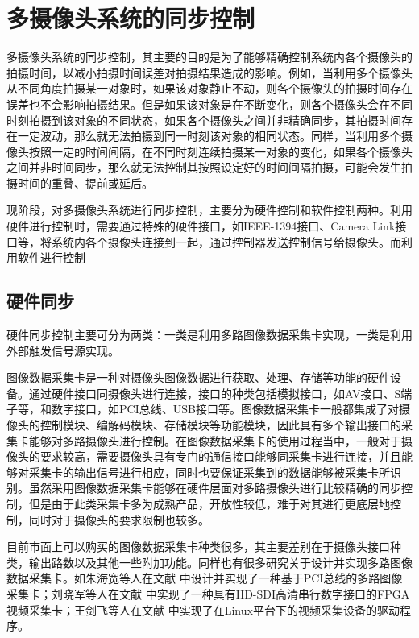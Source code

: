 \section{多摄像头系统的同步控制}

多摄像头系统的同步控制，其主要的目的是为了能够精确控制系统内各个摄像头的拍摄时间，以减小拍摄时间误差对拍摄结果造成的影响。例如，当利用多个摄像头从不同角度拍摄某一对象时，如果该对象静止不动，则各个摄像头的拍摄时间存在误差也不会影响拍摄结果。但是如果该对象是在不断变化，则各个摄像头会在不同时刻拍摄到该对象的不同状态，如果各个摄像头之间并非精确同步，其拍摄时间存在一定波动，那么就无法拍摄到同一时刻该对象的相同状态。同样，当利用多个摄像头按照一定的时间间隔，在不同时刻连续拍摄某一对象的变化，如果各个摄像头之间并非时间同步，那么就无法控制其按照设定好的时间间隔拍摄，可能会发生拍摄时间的重叠、提前或延后。

现阶段，对多摄像头系统进行同步控制，主要分为硬件控制和软件控制两种。利用硬件进行控制时，需要通过特殊的硬件接口，如IEEE-1394接口、Camera Link接口等，将系统内各个摄像头连接到一起，通过控制器发送控制信号给摄像头。而利用软件进行控制----------

\subsection{硬件同步}

硬件同步控制主要可分为两类：一类是利用多路图像数据采集卡实现，一类是利用外部触发信号源实现。

图像数据采集卡是一种对摄像头图像数据进行获取、处理、存储等功能的硬件设备。通过硬件接口同摄像头进行连接，接口的种类包括模拟接口，如AV接口、S端子等，和数字接口，如PCI总线、USB接口等。图像数据采集卡一般都集成了对摄像头的控制模块、编解码模块、存储模块等功能模块，因此具有多个输出接口的采集卡能够对多路摄像头进行控制。在图像数据采集卡的使用过程当中，一般对于摄像头的要求较高，需要摄像头具有专门的通信接口能够同采集卡进行连接，并且能够对采集卡的输出信号进行相应，同时也要保证采集到的数据能够被采集卡所识别。虽然采用图像数据采集卡能够在硬件层面对多路摄像头进行比较精确的同步控制，但是由于此类采集卡多为成熟产品，开放性较低，难于对其进行更底层地控制，同时对于摄像头的要求限制也较多。

目前市面上可以购买的图像数据采集卡种类很多，其主要差别在于摄像头接口种类，输出路数以及其他一些附加功能。同样也有很多研究关于设计并实现多路图像数据采集卡。如朱海宽等人在文献 \cite{17} 中设计并实现了一种基于PCI总线的多路图像采集卡；刘晓军等人在文献 \cite{刘晓军2009采用} 中实现了一种具有HD-SDI高清串行数字接口的FPGA视频采集卡；王剑飞等人在文献 \cite{王剑非2007基于} 中实现了在Linux平台下的视频采集设备的驱动程序。


